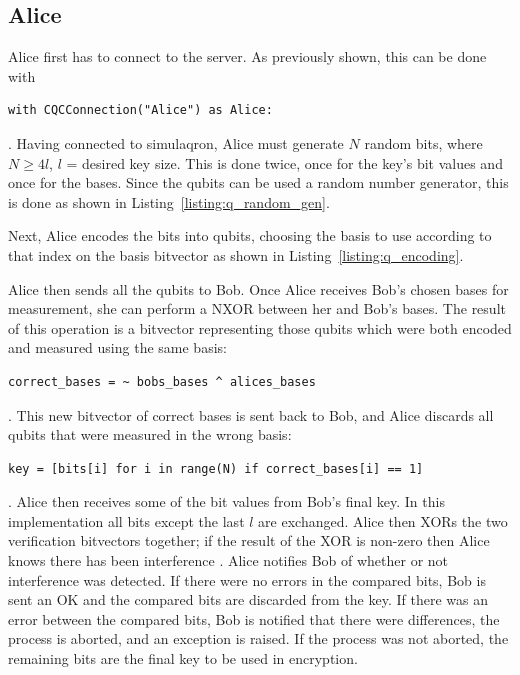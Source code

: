 \subsection{Alice}
Alice first has to connect to the server.
As previously shown, this can be done with \begin{verbatim}with CQCConnection("Alice") as Alice:\end{verbatim}.
Having connected to simulaqron, Alice must generate $N$ random bits, where $N \geq 4l$, $l$ = desired key size.
This is done twice, once for the key's bit values and once for the bases.
Since the qubits can be used a random number generator, this is done as shown in Listing~\ref{listing:q_random_gen}.
\begin{figure}[htp]
\begin{minipage}{\linewidth}
\begin{singlespace}

\end{singlespace}
\end{minipage}
\end{figure}
Next, Alice encodes the bits into qubits, choosing the basis to use according to that index on the basis bitvector as shown in Listing~\ref{listing:q_encoding}.
\begin{figure}[htp]
\noindent
\begin{minipage}{\linewidth}
\begin{singlespace}

\end{singlespace}
\end{minipage}
\end{figure}
Alice then sends all the qubits to Bob.
Once Alice receives Bob's chosen bases for measurement, she can perform a NXOR between her and Bob's bases.
The result of this operation is a bitvector representing those qubits which were both encoded and measured using the same basis: \begin{verbatim}correct_bases = ~ bobs_bases ^ alices_bases\end{verbatim}.
This new bitvector of correct bases is sent back to Bob, and Alice discards all qubits that were measured in the wrong basis: \begin{verbatim}key = [bits[i] for i in range(N) if correct_bases[i] == 1]\end{verbatim}.
Alice then receives some of the bit values from Bob's final key.
In this implementation all bits except the last $l$ are exchanged. 
Alice then XORs the two verification bitvectors together; if the result of the XOR is non-zero then Alice knows there has been interference \cite{qc:agi}.
Alice notifies Bob of whether or not interference was detected.
If there were no errors in the compared bits, Bob is sent an OK and the compared bits are discarded from the key.
If there was an error between the compared bits, Bob is notified that there were differences, the process is aborted, and an exception is raised.
If the process was not aborted, the remaining bits are the final key to be used in encryption.



